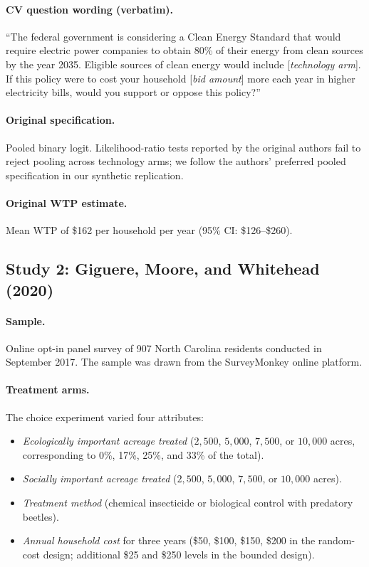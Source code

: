 \documentclass[12pt]{article}
\begin{document}
\paragraph{CV question wording (verbatim).} ``The federal government is considering a Clean Energy Standard that would require electric power companies to obtain 80\% of their energy from clean sources by the year 2035. Eligible sources of clean energy would include [\textit{technology arm}]. If this policy were to cost your household [\textit{bid amount}] more each year in higher electricity bills, would you support or oppose this policy?''

\paragraph{Original specification.} Pooled binary logit. Likelihood-ratio tests reported by the original authors fail to reject pooling across technology arms; we follow the authors' preferred pooled specification in our synthetic replication.

\paragraph{Original WTP estimate.} Mean WTP of \$162 per household per year (95\% CI: \$126--\$260).

\subsection{Study 2: Giguere, Moore, and Whitehead (2020)}

\paragraph{Sample.} Online opt-in panel survey of 907 North Carolina residents conducted in September 2017. The sample was drawn from the SurveyMonkey online platform.

\paragraph{Treatment arms.} The choice experiment varied four attributes:
\begin{itemize}[noitemsep]
    \item \textit{Ecologically important acreage treated} ($2{,}500$, $5{,}000$, $7{,}500$, or $10{,}000$ acres, corresponding to 0\%, 17\%, 25\%, and 33\% of the total).
    \item \textit{Socially important acreage treated} ($2{,}500$, $5{,}000$, $7{,}500$, or $10{,}000$ acres).
    \item \textit{Treatment method} (chemical insecticide or biological control with predatory beetles).
    \item \textit{Annual household cost} for three years (\$50, \$100, \$150, \$200 in the random-cost design; additional \$25 and \$250 levels in the bounded design).
\end{itemize}
\end{document}
